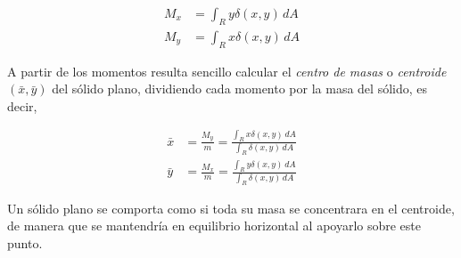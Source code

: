 \documentclass[
  a4paper,
]{scrreport}
\theoremstyle{definition}
\theoremstyle{definition}
\theoremstyle{definition}
\theoremstyle{plain}
\theoremstyle{plain}
\theoremstyle{plain}
\theoremstyle{remark}
\begin{document}
\begin{align*}
M_x 
&= \int_R y\delta(x,y)\,dA \\
M_y 
&= \int_R x\delta(x,y)\,dA
\end{align*}

A partir de los momentos resulta sencillo calcular el \emph{centro de
masas} o \emph{centroide} \((\bar x, \bar y)\) del sólido plano,
dividiendo cada momento por la masa del sólido, es decir,

\begin{align*}
\bar x 
&= \frac{M_y}{m}
= \frac{\int_R x\delta(x,y)\,dA}{\int_R \delta(x,y)\,dA} \\
\bar y
&= \frac{M_x}{m}
= \frac{\int_R y\delta(x,y)\,dA}{\int_R \delta(x,y)\,dA}
\end{align*}

\begin{tcolorbox}[enhanced jigsaw, bottomtitle=1mm, title=\textcolor{quarto-callout-note-color}{\faInfo}\hspace{0.5em}{Nota}, colbacktitle=quarto-callout-note-color!10!white, coltitle=black, leftrule=.75mm, colback=white, toptitle=1mm, toprule=.15mm, titlerule=0mm, opacitybacktitle=0.6, colframe=quarto-callout-note-color-frame, bottomrule=.15mm, arc=.35mm, rightrule=.15mm, breakable, left=2mm, opacityback=0]

Un sólido plano se comporta como si toda su masa se concentrara en el
centroide, de manera que se mantendría en equilibrio horizontal al
apoyarlo sobre este punto.

\end{tcolorbox}
\end{document}
